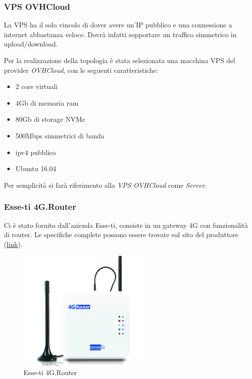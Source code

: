 \subsubsection{VPS OVHCloud}
\label{subsec:vps-ovhcloud}

La VPS ha il solo vincolo di dover avere un'IP pubblico e una connessione a internet abbastanza veloce. Dovrà infatti sopportare un traffico simmetrico in upload/download.

Per la realizzazione della topologia è stata selezionata una macchina VPS del provider \textit{OVHCloud}, con le seguenti caratteristiche:

\begin{itemize}[noitemsep]
	\itemsep0em
	\item 2 core virtuali
	\item 4Gb di memoria ram
	\item 80Gb di storage NVMe
	\item 500Mbps simmetrici di banda
	\item ipv4 pubblico
	\item Ubuntu 16.04
\end{itemize}

Per semplicità si farà riferimento alla \textit{VPS OVHCloud} come \textit{Server}.

\subsubsection{Esse-ti 4G.Router}

Ci è stato fornito dall'azienda Esse-ti, consiste in un gateway 4G con funzionalità di router. Le specifiche complete possono essere trovate sul sito del produttore (\href{https://www.esse-ti.it/4g-router}{link}).


\begin{figure}[ht]
	\centering
	\includegraphics[width=250px]{immagini/4grouter.jpg}
	\caption{Esse-ti 4G.Router}
	\label{fig:esse-ti-router-4g}
\end{figure}

